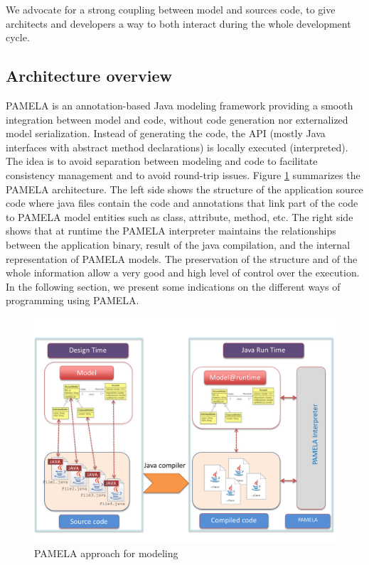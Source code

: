 We advocate for a strong coupling between model and sources code, to give architects and developers a way to both interact during the whole development cycle. 

\subsection{Architecture overview}

PAMELA is an annotation-based Java modeling framework providing a smooth integration between model and code, without code generation nor externalized model serialization. Instead of generating the code, the API (mostly Java interfaces with abstract method declarations) is locally executed (interpreted). The idea is to avoid separation between modeling and code to facilitate consistency management and to avoid round-trip issues. Figure \ref{fig:PamelaVision} summarizes the PAMELA architecture.
The left side shows the structure of the application source code where java files contain the code and annotations that link part of the code to PAMELA model entities such as class, attribute, method, etc. The right side shows that at runtime the PAMELA interpreter maintains the relationships between the application binary, result of the java compilation, and the internal representation of PAMELA models. The preservation of the structure and of the whole information allow a very good and high level of control over the execution. In the following section, we present some indications on the different ways of programming using PAMELA.

\begin{figure}
    \centering
    \includegraphics[width=1.0 \columnwidth]{figures/PamelaVisionV2.pdf}
    \caption{PAMELA approach for modeling}
    \label{fig:PamelaVision}
\end{figure}

